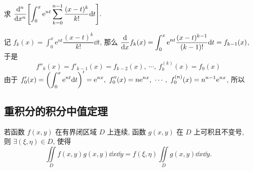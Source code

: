 \begin{example}\scriptsize\linespread{0.8}
    求 $\displaystyle \dv[n]{}{x}\qty[\int_0^x\mathrm{e}^{nt}\sum_{k=0}^{n-1}\dfrac{(x-t)^k}{k!}\dd t].$
\end{example}
\begin{solution}\scriptsize\linespread{0.8}
    记 $\displaystyle f_k(x)=\int_{0}^{x}\mathrm{e}^{nt}\dfrac{(x-t)^k}{k!}\dd t$, 那么 $\displaystyle\dv{x}f_k(x)=\int_{0}^{x}\mathrm{e}^{nt}\dfrac{(x-t)^{k-1}}{(k-1)!}\dd t=f_{k-1}(x)$, 于是
    $$f''_k(x)=f'_{k-1}(x)=f_{k-2}(x),~\cdots,~f_k^{(k)}(x)=f_0(x)$$
    由于 $\displaystyle f_0'(x)=\qty(\int_{0}^{x}\mathrm{e}^{nt}\dd t)'=\mathrm{e}^{nx},~f_0''(x)=n\mathrm{e}^{nx},~\cdots,~f_0^{(n)}(x)=n^{n-1}\mathrm{e}^{nx}$, 所以
\end{solution}

% 
% 

\subsection{重积分的积分中值定理}

\begin{theorem}[二重积分中值定理]
    若函数 $f(x,y)$ 在有界闭区域 $D$ 上连续, 函数 $g(x,y)$ 在 $D$ 上可积且不变号, 则 $\exists(\xi,\eta)\in D$, 使得 $$\iint\limits_D f(x,y)g(x,y)\dd x\dd y=f(\xi,\eta)\iint\limits_D g(x,y)\dd x\dd y.$$
\end{theorem}

